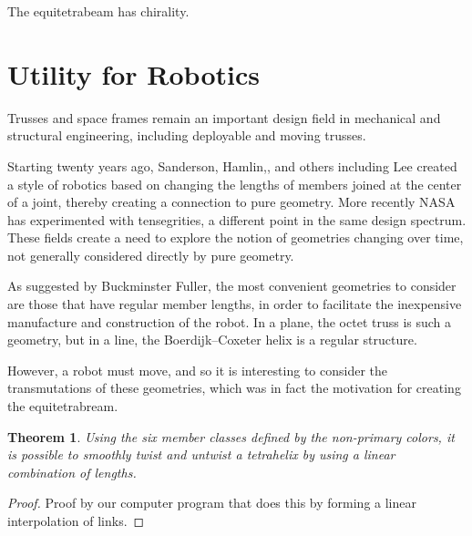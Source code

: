 \documentclass[11pt]{article}
\newtheorem{theorem}{Theorem}
\begin{document}
The equitetrabeam has chirality.

\section{Utility for Robotics}

Trusses and space frames remain an important design field in mechanical and structural engineering\cite{mikulas1985sequentially},
including deployable and moving trusses\cite{claypool2012readily}.

Starting twenty years ago, Sanderson\cite{sanderson1996modular}, Hamlin,\cite{TetrobotBook}, and others including Lee\cite{lee2002dynamic}
created a style of robotics based on changing the lengths of members
joined at the center of a joint, thereby creating a connection to pure geometry. More recently NASA has experimented with
tensegrities\cite{NTRT}, a different point in the same design spectrum. These fields create a need to explore the notion of
geometries changing over time, not generally considered directly by pure geometry.

As suggested by Buckminster Fuller, the most convenient geometries to consider are those that have regular member
lengths, in order to facilitate the inexpensive manufacture and construction of the robot.  In a plane, the octet truss
is such a geometry, but in a line, the Boerdijk--Coxeter helix is a regular structure.

However, a robot must move, and so it is interesting to consider the transmutations of these geometries, which was in
fact the motivation for creating the equitetrabream.

\begin{theorem}

  Using the six member classes defined by the non-primary colors, it is possible to smoothly twist and untwist a tetrahelix by
  using a linear combination of lengths.
  
\end{theorem}

\begin{proof}
  Proof by our computer program that does this by forming a linear interpolation of links.
\end{proof}
\end{document}
